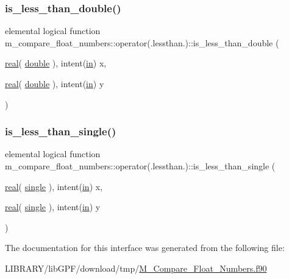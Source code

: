 \subsubsection{\texorpdfstring{is\+\_\+less\+\_\+than\+\_\+double()}{is\_less\_than\_double()}}
{\footnotesize\ttfamily elemental logical function m\+\_\+compare\+\_\+float\+\_\+numbers\+::operator(.lessthan.)\+::is\+\_\+less\+\_\+than\+\_\+double (\begin{DoxyParamCaption}\item[{\hyperlink{read__watch_83_8txt_abdb62bde002f38ef75f810d3a905a823}{real}( \hyperlink{namespacem__compare__float__numbers_af4b789cd6e1a2abcd412eaf29e91ea0c}{double} ), intent(\hyperlink{M__journal_83_8txt_afce72651d1eed785a2132bee863b2f38}{in})}]{x,  }\item[{\hyperlink{read__watch_83_8txt_abdb62bde002f38ef75f810d3a905a823}{real}( \hyperlink{namespacem__compare__float__numbers_af4b789cd6e1a2abcd412eaf29e91ea0c}{double} ), intent(\hyperlink{M__journal_83_8txt_afce72651d1eed785a2132bee863b2f38}{in})}]{y }\end{DoxyParamCaption})\hspace{0.3cm}{\ttfamily [private]}}

\mbox{\label{interfacem__compare__float__numbers_1_1operator_07_8lessthan_8_08_a89ad5ea470a44213216fd4c36ee1fe5d}} 
\subsubsection{\texorpdfstring{is\+\_\+less\+\_\+than\+\_\+single()}{is\_less\_than\_single()}}
{\footnotesize\ttfamily elemental logical function m\+\_\+compare\+\_\+float\+\_\+numbers\+::operator(.lessthan.)\+::is\+\_\+less\+\_\+than\+\_\+single (\begin{DoxyParamCaption}\item[{\hyperlink{read__watch_83_8txt_abdb62bde002f38ef75f810d3a905a823}{real}( \hyperlink{namespacem__compare__float__numbers_a5f122d46d6ad7d1cf0b899d9c855c498}{single} ), intent(\hyperlink{M__journal_83_8txt_afce72651d1eed785a2132bee863b2f38}{in})}]{x,  }\item[{\hyperlink{read__watch_83_8txt_abdb62bde002f38ef75f810d3a905a823}{real}( \hyperlink{namespacem__compare__float__numbers_a5f122d46d6ad7d1cf0b899d9c855c498}{single} ), intent(\hyperlink{M__journal_83_8txt_afce72651d1eed785a2132bee863b2f38}{in})}]{y }\end{DoxyParamCaption})\hspace{0.3cm}{\ttfamily [private]}}



The documentation for this interface was generated from the following file\+:\begin{DoxyCompactItemize}
\item 
L\+I\+B\+R\+A\+R\+Y/lib\+G\+P\+F/download/tmp/\hyperlink{M__Compare__Float__Numbers_8f90}{M\+\_\+\+Compare\+\_\+\+Float\+\_\+\+Numbers.\+f90}\end{DoxyCompactItemize}
